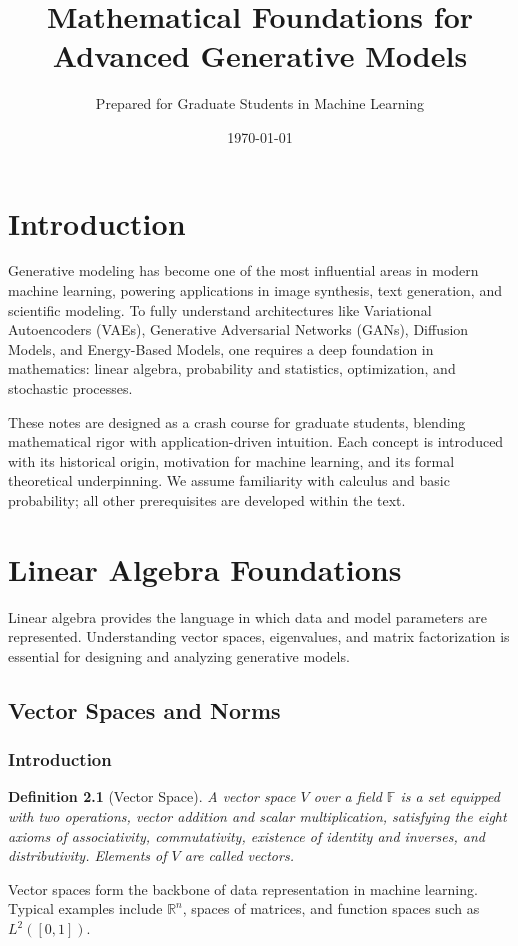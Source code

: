 \documentclass[11pt]{book}
\title{Mathematical Foundations for Advanced Generative Models}
\author{Prepared for Graduate Students in Machine Learning}
\date{\today}
\newtheorem{definition}{Definition}[chapter]
\begin{document}
\maketitle
\tableofcontents

\chapter{Introduction}
Generative modeling has become one of the most influential areas in modern machine learning, powering applications in image synthesis, text generation, and scientific modeling. To fully understand architectures like Variational Autoencoders (VAEs), Generative Adversarial Networks (GANs), Diffusion Models, and Energy-Based Models, one requires a deep foundation in mathematics: linear algebra, probability and statistics, optimization, and stochastic processes.

These notes are designed as a crash course for graduate students, blending mathematical rigor with application-driven intuition. Each concept is introduced with its historical origin, motivation for machine learning, and its formal theoretical underpinning. We assume familiarity with calculus and basic probability; all other prerequisites are developed within the text.

\chapter{Linear Algebra Foundations}
Linear algebra provides the language in which data and model parameters are represented. Understanding vector spaces, eigenvalues, and matrix factorization is essential for designing and analyzing generative models.

\section{Vector Spaces and Norms}
\subsection{Introduction}
\begin{definition}[Vector Space]
A \emph{vector space} $V$ over a field $\mathbb{F}$ is a set equipped with two operations, vector addition and scalar multiplication, satisfying the eight axioms of associativity, commutativity, existence of identity and inverses, and distributivity. Elements of $V$ are called \emph{vectors}.
\end{definition}
Vector spaces form the backbone of data representation in machine learning. Typical examples include $\mathbb{R}^n$, spaces of matrices, and function spaces such as $L^2([0,1])$.
\end{document}
